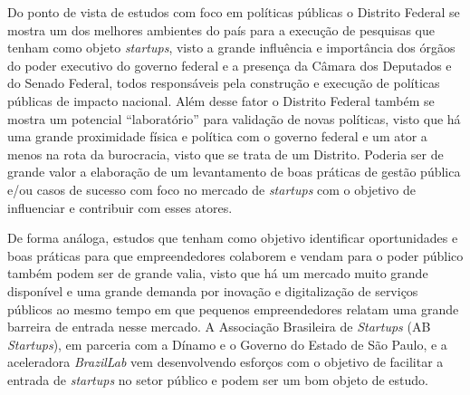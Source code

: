 Do ponto de vista de estudos com foco em políticas públicas o Distrito Federal se mostra um dos melhores ambientes do país para a execução de pesquisas que tenham como objeto \textit{startups}, visto a grande influência e importância dos órgãos do poder executivo do governo federal e a presença da Câmara dos Deputados e do Senado Federal, todos responsáveis pela construção e execução de políticas públicas de impacto nacional. Além desse fator o Distrito Federal também se mostra um potencial ``laboratório'' para validação de novas políticas, visto que há uma grande proximidade física e política com o governo federal e um ator a menos na rota da burocracia, visto que se trata de um Distrito. Poderia ser de grande valor a elaboração de um levantamento de boas práticas de gestão pública e/ou casos de sucesso com foco no mercado de \textit{startups} com o objetivo de influenciar e contribuir com esses atores. 

De forma análoga, estudos que tenham como objetivo identificar oportunidades e boas práticas para que empreendedores colaborem e vendam para o poder público também podem ser de grande valia, visto que há um mercado muito grande disponível e uma grande demanda por inovação e digitalização de serviços públicos ao mesmo tempo em que pequenos empreendedores relatam uma grande barreira de entrada nesse mercado. A Associação Brasileira de \textit{Startups} (AB \textit{Startups}), em parceria com a Dínamo e o Governo do Estado de São Paulo, e a aceleradora \textit{BrazilLab} vem desenvolvendo esforços com o objetivo de facilitar a entrada de \textit{startups} no setor público e podem ser um bom objeto de estudo.